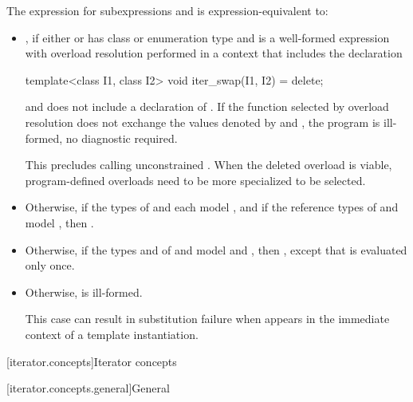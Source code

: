 \pnum
The expression  for subexpressions
 and  is expression-equivalent to:
\begin{itemize}
\item {}, if either
 or  has class or enumeration type and
 is a well-formed expression
with overload resolution performed in a context that includes the declaration
\begin{codeblock}
template<class I1, class I2>
  void iter_swap(I1, I2) = delete;
\end{codeblock}
and does not include a declaration of .
If the function selected by overload resolution does not exchange the values
denoted by  and ,
the program is ill-formed, no diagnostic required.
\begin{note}
This precludes calling unconstrained . When the deleted
overload is viable, program-defined overloads need to be more
specialized to be selected.
\end{note}

\item Otherwise, if the types of  and  each model
, and if the reference types of  and 
model ,
then .

\item Otherwise, if the types  and  of  and
 model  and
, then
,
except that  is evaluated only once.

\item Otherwise,  is ill-formed.
\begin{note}
This case can result in substitution failure when 
appears in the immediate context of a template instantiation.
\end{note}
\end{itemize}

[iterator.concepts]{Iterator concepts}

[iterator.concepts.general]{General}

